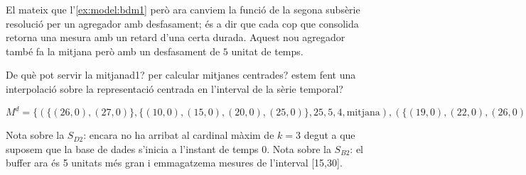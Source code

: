 \begin{example} 
\label{ex:model:bdm-desfasaments}

\todo{}

El mateix que l'\autoref{ex:model:bdm1} però ara canviem la funció de
la segona subsèrie resolució per un agregador amb desfasament; és a
dir que cada cop que consolida retorna una mesura amb un retard d'una certa durada. Aquest nou agregador també fa la mitjana però amb un desfasament de $5$ unitat de temps. 

De què pot servir la mitjanad1? per calcular mitjanes centrades? estem fent una interpolació sobre la representació centrada en l'interval de la sèrie temporal? \todo{}


$M^d = \{ ( \{(26,0),(27,0)\}  , \{(10,0),(15,0),(20,0),(25,0)\} , 25 , 5 ,4 , \text{mitjana} ) , ( \{(19,0),(22,0),(26,0),(27,0)\} , \{(5,0),(15,0)\} , 20 , 10 ,3 , \text{mitjanad1} ) \}$




Nota sobre la $S_{D2}$: encara no ha arribat al cardinal màxim de
$k=3$ degut a que suposem que la base de dades s'inicia a l'instant de
temps $0$. Nota sobre la $S_{B2}$: el buffer ara és 5 unitats més gran i emmagatzema mesures de l'interval [15,30].



\end{example}

